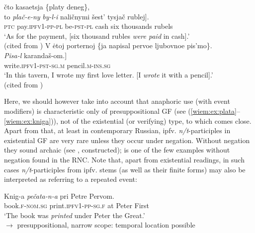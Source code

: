 \documentclass[output=paper]{langscibook}
\begin{document}
\ea\label{wiem:ex:plata}{
{čto} {kasaetsja} \{{platy} {deneg}\},\\
\gll \minsp{[} {to} {\textit{plač-e-ny}} \textit{{by-l-i}} {naličnymi} {šest'} {tysjač} {rublej}].\\ 
{} \textsc{ptc} pay.\textsc{ipfv1-pp-pl} be-\textsc{pst-pl} cash six thousands rubels\\
\glt ‘As for the payment, [six thousand rubles \textit{were paid} in cash].’\\\hfill
(cited from \citealt[70]{Borik.Gehrke2018})}
\ex\label{wiem:ex:pismo}{
{V} {ėtoj} {porternoj} \{{ja} {napisal} {pervoe} {ljubovnoe} {pis'mo}\}.\\ \gll \minsp{[} \textit{{Pisa-l}} {karandaš-om}.]\\
{} write.\textsc{ipfv1-pst-sg.m} pencil.\textsc{m-ins.sg}\\
\glt ‘In this tavern, I wrote my first love letter. [I \textit{wrote} it with a pencil].’\\\hfill
(cited from \citealt[64]{Borik.Gehrke2018})}
\z

\noindent Here, we should however take into account that anaphoric use (with event modifiers) is characteristic only of presuppositional GF (see (\ref{wiem:ex:plata}--\ref{wiem:ex:kniga})), not of the existential (or verifying) type, to which  comes close. Apart from that, at least in contemporary Russian, ipfv. \textit{n/t}-participles in existential GF are very rare unless they occur under negation. Without negation they sound archaic (see , constructed);  is one of the few examples without negation found in the RNC. Note that, apart from existential readings, in such cases \textit{n/t}-participles from ipfv. stems (as well as their finite forms) may also be interpreted as referring to a repeated event:\largerpage

\ea\label{wiem:ex:kniga} {\gll
{Knig-a} {\textit{pečata-n-a}} {pri} {Petre} {Pervom}.\\
book.\textsc{f-nom.sg} print.\textsc{ipfv1-pp-sg.f} at Peter First \\
\glt‘The book was \textit{printed} under Peter the Great.’ \\  $\rightarrow$ presuppositional, narrow scope:  temporal location possible 
}

\end{document}
